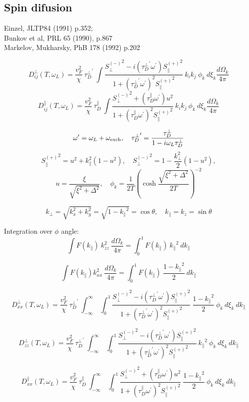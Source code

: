 \documentclass[a4paper]{article}
\begin{document}
\subsection*{Spin difusion}

\def\tdp{\tau_D^\perp}
\def\tdpa{\tau_D^\parallel}
\def\ol{\omega_L}
\def\oe{\omega_{\rm exch}}
\def\op{\omega^\prime}
\def\tp{{\tdp}^\prime}
\def\t{\tdpa}

\def\sm{{S_\perp^{(-)}}^2}
\def\sp{{S_\parallel^{(+)}}^2}

\def\kpe{{k_\perp}}
\def\kpa{{k_\parallel}}

\def\smx{{S_{xx}^{(-)}}^2}
\def\spz{{S_{zz}^{(+)}}^2}


Einzel, JLTP84 (1991) p.352;\\
Bunkov et al, PRL 65 (1990), p.867\\
Markelov, Mukharsky, PhB 178 (1992) p.202

$$
D^\perp_{ij}(T, \ol) =
  \frac{v_F^2}{\chi}\ \tp
  \  \int \frac{\sm - i(\tp\op)\sp}{1+(\tp\op)^2\sp}
  \  k_i k_j\ \phi_k\ d\xi_k\frac{d\Omega_k}{4\pi}
$$
$$
D^\parallel_{ij}(T, \ol) =
  \frac{v_F^2}{\chi}\ \t
  \  \int \frac{\sm + (\t\op)u^2 }{1+(\t\op)^2\sp}
  \  k_i k_j\ \phi_k\ d\xi_k\frac{d\Omega_k}{4\pi}
$$

$$
\op = \ol+\oe,\quad
\tp = \frac{\tdp}{1-i\ol\tdp}
$$
$$
\sp = u^2 + k_\parallel^2(1-u^2),\quad
\sm = 1-\frac{k_\perp^2}{2}(1-u^2),
$$
$$
u=\frac{\xi}{\sqrt{\xi^2+\Delta^2}}, \quad
\phi_k = \frac{1}{2T}\left(\cosh\frac{\sqrt{\xi^2+\Delta^2}}{2T}\right)^{-2}
$$

$$
k_\perp = \sqrt{k_x^2+k_y^2} = \sqrt{1-\kpa^2} = \cos\theta, \quad
k_\parallel = k_z = \sin\theta
$$

Integration over $\phi$ angle:
$$
\int F(\kpa)\ k_{zz}^2\ \frac{d\Omega_k}{4\pi} =
\int_0^1 F(\kpa)\ \kpa^2\ d\kpa
$$

$$
\int F(\kpa) k_{xx}^2\ \frac{d\Omega_k}{4\pi} =
\int_0^1 F(\kpa)\ \frac{1-\kpa^2}{2}\ d\kpa
$$


$$
D^\perp_{xx}(T, \ol) =
  \frac{v_F^2}{\chi}\ \tp
  \ \int_{-\infty}^{\infty}\ \int_{0}^{1}
  \frac{\sm - i(\tp\op)\sp}{1+(\tp\op)^2\sp}
  \ \frac{1-\kpa^2}{2}\ \phi_k\ d\xi_k\ d\kpa
$$

$$
D^\perp_{zz}(T, \ol) =
  \frac{v_F^2}{\chi}\ \tp
  \ \int_{-\infty}^{\infty}\ \int_{0}^{1}
  \frac{\sm - i(\tp\op)\sp}{1+(\tp\op)^2\sp}
  \ \kpa^2\ \phi_k\ d\xi_k\ d\kpa
$$

$$
D^\parallel_{xx}(T, \ol) =
  \frac{v_F^2}{\chi}\ \t
  \ \int_{-\infty}^{\infty}\ \int_{0}^{1}
  \frac{\sm + (\t\op)u^2 }{1+(\t\op)^2\sp}
  \  \frac{1-\kpa^2}{2}\ \phi_k\ d\xi_k\ d\kpa
$$
\end{document}
